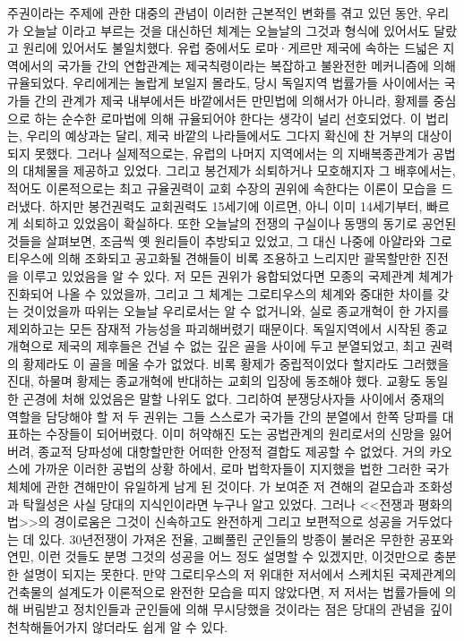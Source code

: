 주권이라는 주제에 관한 대중의 관념이 이러한 근본적인 변화를 겪고 있던 동안,
우리가 오늘날 이라고 부르는 것을 대신하던 체계는
오늘날의 그것과 형식에 있어서도 달랐고 원리에 있어서도 불일치했다.
유럽 중에서도 로마^^b7게르만 제국에 속하는 드넓은 지역에서의
국가들 간의 연합관계는 제국칙령이라는 복잡하고 불완전한 메커니즘에 의해
규율되었다.
우리에게는 놀랍게 보일지 몰라도, 당시 독일지역 법률가들 사이에서는
국가들 간의 관계가 제국 내부에서든 바깥에서든
만민법에 의해서가 아니라,
황제를 중심으로 하는 순수한 로마법에 의해
규율되어야 한다는 생각이 널리 선호되었다.
이 법리는, 우리의 예상과는 달리,
제국 바깥의 나라들에서도
그다지 확신에 찬 거부의 대상이 되지 못했다.
그러나 실제적으로는, 유럽의 나머지 지역에서는
의 지배복종관계가 공법의 대체물을 제공하고 있었다.
그리고 봉건제가 쇠퇴하거나 모호해지자 그 배후에서는,
적어도 이론적으로는 최고 규율권력이 교회 수장의 권위에 속한다는 이론이
모습을 드러냈다.
하지만 봉건권력도 교회권력도 15세기에 이르면, 아니 이미 14세기부터,
빠르게 쇠퇴하고 있었음이 확실하다.
또한
오늘날의 전쟁의 구실이나 동맹의 동기로 공언된 것들을 살펴보면,
조금씩 옛 원리들이 추방되고 있었고,
그 대신 나중에 아얄라와 그로티우스에 의해 조화되고 공고화될 견해들이
비록 조용하고 느리지만
괄목할만한 진전을 이루고 있었음을 알 수 있다.
저 모든 권위가 융합되었다면 모종의 국제관계 체계가 진화되어 나올 수 있었을까,
그리고 그 체계는 그로티우스의 체계와 중대한 차이를 갖는 것이었을까 따위는
오늘날 우리로서는 알 수 없거니와, 실로 종교개혁이 한 가지를 제외하고는
모든 잠재적 가능성을 파괴해버렸기 때문이다.
독일지역에서 시작된 종교개혁으로 제국의 제후들은 건널 수 없는 깊은 골을
사이에 두고 분열되었고, 최고 권력의 황제라도
이 골을 메울 수가 없었다.
비록 황제가 중립적이었다 할지라도 그러했을진대,
하물며 황제는 종교개혁에 반대하는 교회의 입장에 동조해야 했다.
교황도 동일한 곤경에 처해 있었음은 말할 나위도 없다.
그리하여 분쟁당사자들 사이에서 중재의 역할을 담당해야 할 저 두 권위는
그들 스스로가 국가들 간의 분열에서 한쪽 당파를 대표하는 수장들이 되어버렸다.
이미 허약해진 도는 공법관계의 원리로서의 신망을 잃어버려,
종교적 당파성에 대항할만한 어떠한 안정적 결합도 제공할 수 없었다.
거의 카오스에 가까운 이러한 공법의 상황 하에서,
로마 법학자들이 지지했을 법한 그러한 국가체체에 관한 견해만이
유일하게 남게 된 것이다.
가 보여준 저 견해의 겉모습과 조화성과 탁월성은
사실 당대의 지식인이라면 누구나 알고 있었다.
그러나 <<전쟁과 평화의 법>>의 경이로움은
그것이 신속하고도 완전하게 그리고 보편적으로 성공을 거두었다는 데 있다.
30년전쟁이 가져온 전율, 고삐풀린 군인들의 방종이 불러온 무한한 공포와 연민,
이런 것들도 분명 그것의 성공을 어느 정도 설명할 수 있겠지만,
이것만으로 충분한 설명이 되지는 못한다.
만약 그로티우스의 저 위대한 저서에서 스케치된 국제관계의 건축물의 설계도가
이론적으로 완전한 모습을 띠지 않았다면,
저 저서는 법률가들에 의해 버림받고
정치인들과 군인들에 의해 무시당했을 것이라는 점은
당대의 관념을 깊이 천착해들어가지 않더라도 쉽게 알 수 있다.

